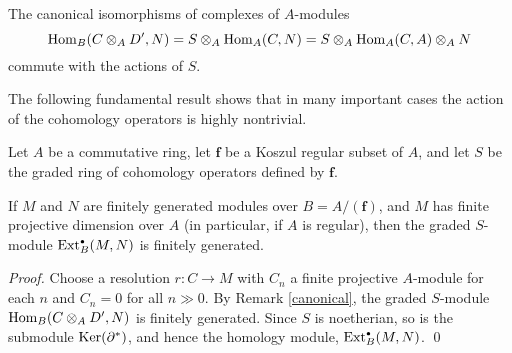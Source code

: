 \begin{Remark}
\label{canonical}
The canonical isomorphisms of complexes of $A$-modules
\begin{equation*}
\operatorname{Hom}_B(C \otimes_A D', N)=S \otimes_A \operatorname{Hom}_A(C, N)=
S \otimes_A \operatorname{Hom}_A(C, A) \otimes_A N
\end{equation*}
commute with the actions of $S$.
 \end{Remark}

The following fundamental result shows that in many important cases the
action of the cohomology operators is highly nontrivial.

\begin{theorem}
\label{finiteness}
Let $A$ be a commutative ring, let ${\boldsymbol f}$ be a Koszul
regular subset of $A$, and let $S$ be the graded ring of cohomology
operators defined by $\boldsymbol f$.

If $M$ and $N$ are finitely generated modules over $B=A/({\boldsymbol
f})$, and $M$ has finite projective dimension over $A$ (in particular,
if $A$ is regular), then the graded $S$-module $\operatorname{Ext}^{\scriptscriptstyle\bullet}_B(M,N)$ is
finitely generated.
 \end{theorem}

\begin{proof}
Choose a resolution $r\colon C\to M$ with $C_n$ a finite projective
$A$-module for each $n$ and $C_n=0$ for all $n\gg0$.  By Remark
\eqref{canonical}, the graded $S$-module $\operatorname{Hom}_B(C \otimes_A D',N)$ is
finitely generated.  Since $S$ is noetherian, so is the submodule
$\operatorname{Ker}(\partial^*)$, and hence the homology module, $\operatorname{Ext}^{\scriptscriptstyle\bullet}_B(M,N)$.
 \qed
  \end{proof}

